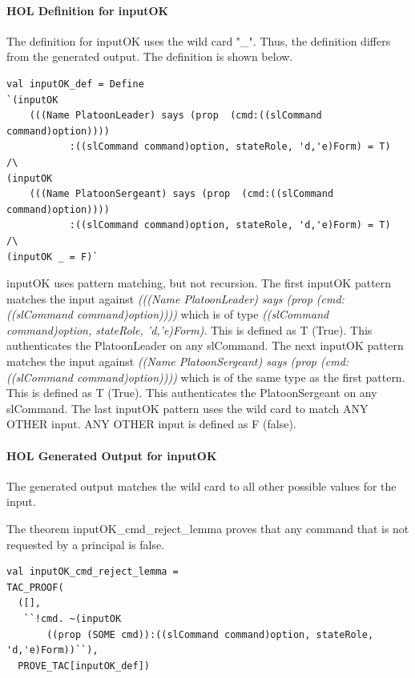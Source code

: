 \documentclass[../../main/main.tex]{subfiles}
\begin{document}
\paragraph*{HOL Definition for inputOK}

The  definition for inputOK uses the wild card "_".  Thus, the  definition differs from the  generated output.  The  definition is shown below. 

\begin{lstlisting}
val inputOK_def = Define
`(inputOK
	(((Name PlatoonLeader) says (prop  (cmd:((slCommand command)option))))
	       :((slCommand command)option, stateRole, 'd,'e)Form) = T)  /\
(inputOK
	(((Name PlatoonSergeant) says (prop  (cmd:((slCommand command)option))))
	       :((slCommand command)option, stateRole, 'd,'e)Form) = T)  /\
(inputOK _ = F)`
\end{lstlisting}

inputOK uses pattern matching, but not recursion.  The first inputOK pattern matches the input against \textit{(((Name PlatoonLeader) says (prop  (cmd:((slCommand command)option))))} which is of type \textit{((slCommand command)option, stateRole, 'd,'e)Form)}.  This is defined as T (True).  This authenticates the PlatoonLeader on any slCommand.  The next inputOK pattern matches the input against \textit{((Name PlatoonSergeant) says (prop  (cmd:((slCommand command)option))))} which is of the same type as the first pattern.  This is defined as T (True).  This authenticates the PlatoonSergeant on any slCommand.  The last inputOK pattern uses the wild card to match ANY OTHER input.  ANY OTHER input is defined as F (false).
	 
	 
\paragraph*{HOL Generated Output for inputOK}

The  generated output matches the wild card to all other possible values for the input.

\HOLThmTag{ssmPlanPB}{inputOK_def}\HOLssmPlanPBTheoremsinputOKXXdef

The theorem inputOK_cmd_reject_lemma proves that any command that is not requested by a principal is false.

\begin{lstlisting}
val inputOK_cmd_reject_lemma =
TAC_PROOF(
  ([],
   ``!cmd. ~(inputOK
   	   ((prop (SOME cmd)):((slCommand command)option, stateRole, 'd,'e)Form))``),
  PROVE_TAC[inputOK_def])
\end{lstlisting}
\end{document}
